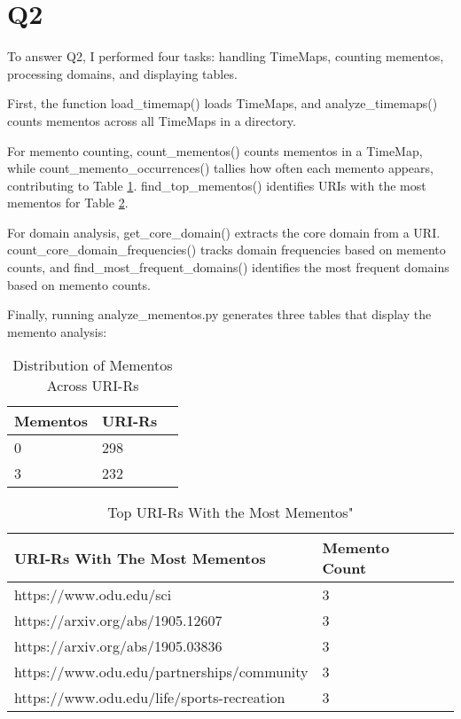\documentclass[12pt]{article}
\begin{document}
\section*{Q2}

To answer Q2, I performed four tasks: handling TimeMaps, counting mementos, processing domains, and displaying tables.

First, the function load\_timemap() loads TimeMaps, and analyze\_timemaps() counts mementos across all TimeMaps in a directory.

For memento counting, count\_mementos() counts mementos in a TimeMap, while count\_memento\_occurrences() tallies how often each memento appears, contributing to Table \ref{tbl:memento_distribution}. find\_top\_mementos() identifies URIs with the most mementos for Table \ref{tbl:top_uris}.

For domain analysis, get\_core\_domain() extracts the core domain from a URI. count\_core\_domain\_frequencies() tracks domain frequencies based on memento counts, and find\_most\_frequent\_domains() identifies the most frequent domains based on memento counts.

Finally, running analyze\_mementos.py generates three tables that display the memento analysis:

\begin{table}[h]
\centering
\caption{Distribution of Mementos Across URI-Rs}
\label{tbl:memento_distribution}
\begin{tabular}{|l|l|l|}
\hline
\textbf{Mementos} & \textbf{URI-Rs} \\ \hline \hline
0 & 298 \\ \hline
3 & 232 \\ \hline
\end{tabular}
\end{table}

\begin{table}[h]
\centering
\caption{Top URI-Rs With the Most Mementos"}
\label{tbl:top_uris}
\begin{tabular}{|l|l|l|}
\hline
\textbf{URI-Rs With The Most Mementos} & \textbf{Memento Count} \\ \hline \hline
https://www.odu.edu/sci & 3 \\ \hline
https://arxiv.org/abs/1905.12607 & 3 \\ \hline
https://arxiv.org/abs/1905.03836 & 3 \\ \hline
https://www.odu.edu/partnerships/community & 3 \\ \hline
https://www.odu.edu/life/sports-recreation & 3 \\ \hline
\end{tabular}
\end{table}
\end{document}
